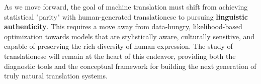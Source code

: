 \documentclass[11pt,a4paper]{article}
\begin{document}
As we move forward, the goal of machine translation must shift from achieving statistical "parity" with human-generated translationese to pursuing \textbf{linguistic authenticity}. This requires a move away from data-hungry, likelihood-based optimization towards models that are stylistically aware, culturally sensitive, and capable of preserving the rich diversity of human expression. The study of translationese will remain at the heart of this endeavor, providing both the diagnostic tools and the conceptual framework for building the next generation of truly natural translation systems.



\end{document}
